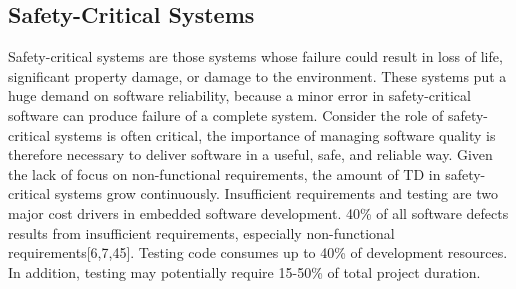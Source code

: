 \subsection{Safety-Critical Systems}
Safety-critical systems are those systems whose failure could result in loss of life, significant property damage, or damage to the environment\cite{knight2002safety}. These systems put a huge demand on software reliability, because a minor error in safety-critical software can produce failure of a complete system\cite{ebert2009embedded,trienekens2010quality,pretschner2007software}. Consider the role of safety-critical systems is often critical, the importance of managing software quality is therefore necessary to deliver software in a useful, safe, and reliable way. Given the lack of focus on non-functional requirements, the amount of TD in safety-critical systems grow continuously. Insufficient requirements and testing are two major cost drivers in embedded software development\cite{ebert2009embedded,graaf2003embedded}. 40\% of all software defects results from insufficient requirements, especially non-functional requirements[6,7,45]\cite{ebert2009embedded,graaf2003embedded,washizaki2007quality}. Testing code consumes up to 40\% of development resources. In addition, testing may potentially require 15-50\% of total project duration\cite{ebert2009embedded}.  

\cleardoublepage